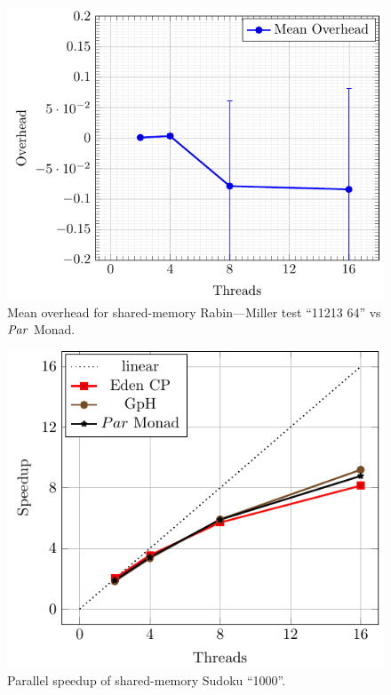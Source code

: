 \documentclass[paper=A4,twoside=true,openright,parskip=full,chapterprefix=true,headings=normal,bibliography=totoc,listof=totoc,titlepage=on,captions=tableabove,draft=false,british]{scrreprt}%
\renewcommand{\enquote}[1]{{``}#1{''}}
\begin{document}
\begin{figure}[h]
\centering
\includegraphics{src/img/overSMRM64Par.pdf}
\caption{Mean overhead for shared-memory Rabin---Miller test
\enquote{11213 64} vs \ensuremath{\Conid{Par}} Monad.\label{fig:overSMRM64Par}}
\end{figure}

\begin{figure}[h]
\centering
\includegraphics{src/img/perfSMSudoku.pdf}
\caption{Parallel speedup of shared-memory Sudoku
\enquote{1000}.\label{fig:perfSMSudoku}}
\end{figure}
\end{document}
